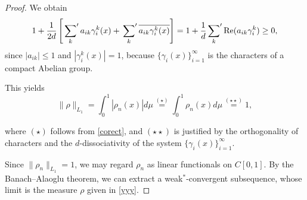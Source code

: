 \documentclass[12pt]{article}
\begin{document}
	\begin{proof}
		We obtain
		\begin{equation} \label{corect}
			1 + \frac{1}{2d}\left[\sideset{}{'}{\sum}_{k} a_{ik} \gamma_i^k(x) +  \sideset{}{'}{\sum}_{k} \overline{ a_{ik}\gamma_i^{k}(x)}\right] = 1 + \frac{1}{d} \sideset{}{'}{\sum}_{k}\mathrm{Re}(a_{ik}\gamma_i^k) \ge 0,   
		\end{equation}
		since $|a_{ik}| \le 1$ and $|\gamma_{i}^k(x)|=1$,  because $\{\gamma_{i}(x)\}_{i=1}^{\infty}$ is the characters of a compact Abelian group.
		
		This yields 
		\begin{equation*} 
			\|\rho\|_{L_1} = \int^1_0 |\rho_n(x)| d \mu \overset{(\star)}{=} \int_0^1 \rho_n(x)d\mu  \overset{(\star \star)}{=} 1, 
		\end{equation*}
		
where $(\star)$ follows from \eqref{corect}, and $(\star\star)$ is justified by the orthogonality of characters and the $d$-dissociativity of the system $\{\gamma_{i}(x)\}_{i=1}^{\infty}$. 

Since $\|\rho_n\|_{L_1} = 1$, we may regard $\rho_n$ as linear functionals on $C[0,1]$. By the Banach--Alaoglu theorem, we can extract a weak$^*$-convergent subsequence, whose limit is the measure $\rho$ given in \eqref{yyy}.    
	\end{proof}
	
\end{document}
